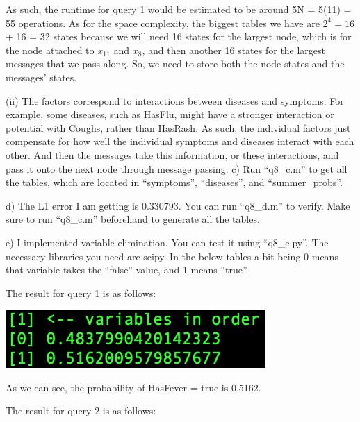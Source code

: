 \documentclass[12pt]{article}
\begin{document}
As such, the runtime for query 1 would be estimated to be around 5N = 5(11) = 55 operations. As for the space complexity, the biggest tables we have are $2^4 = 16$ + 16 = 32 states because we will need 16 states for the largest node, which is for the node attached to $x_11$ and $x_8$, and then another 16 states for the largest messages that we pass along. So, we need to store both the node states and the messages' states.

(ii) The factors correspond to interactions between diseases and symptoms. For example, some diseases, such as HasFlu, might have a stronger interaction or potential with Coughs, rather than HasRash. As such, the individual factors just compensate for how well the individual symptoms and diseases interact with each other. And then the messages take this information, or these interactions, and pass it onto the next node through message passing.
c) Run ``q8\_c.m'' to get all the tables, which are located in ``symptoms'', ``diseases'', and ``summer\_probs''.

d) The L1 error I am getting is 0.330793. You can run ``q8\_d.m'' to verify. Make sure to run ``q8\_c.m'' beforehand to generate all the tables.

e) I implemented variable elimination. You can test it using ``q8\_e.py''. The necessary libraries you need are scipy. In the below tables a bit being 0 means that variable takes the ``false'' value, and 1 means ``true''.

The result for query 1 is as follows:

\includegraphics[scale=0.8]{query1}

As we can see, the probability of HasFever = true is 0.5162.

The result for query 2 is as follows:
\end{document}
